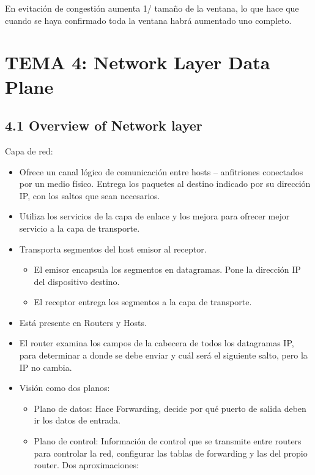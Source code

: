 \documentclass[12pt, twoside, openright]{report} %
\begin{document}
    En evitación de congestión aumenta 1/ tamaño de la ventana, lo que
    hace que cuando se haya confirmado toda la ventana habrá aumentado
    uno completo.

\chapter{TEMA 4: Network Layer Data Plane}

\section{4.1 Overview of Network layer}

    Capa de red:

    \begin{itemize}
    \item
      Ofrece un canal lógico de comunicación entre hosts -- anfitriones
      conectados por un medio físico. Entrega los paquetes al destino
      indicado por su dirección IP, con los saltos que sean necesarios.
    \item
      Utiliza los servicios de la capa de enlace y los mejora para
      ofrecer mejor servicio a la capa de transporte.
    \item
      Transporta segmentos del host emisor al receptor.

      \begin{itemize}
      \item
        El emisor encapsula los segmentos en datagramas. Pone la
        dirección IP del dispositivo destino.
      \item
        El receptor entrega los segmentos a la capa de transporte.
      \end{itemize}
    \item
      Está presente en Routers y Hosts.
    \item
      El router examina los campos de la cabecera de todos los
      datagramas IP, para determinar a donde se debe enviar y cuál será
      el siguiente salto, pero la IP no cambia.
    \item
      Visión como dos planos:

      \begin{itemize}
      \item
        Plano de datos: Hace Forwarding, decide por qué puerto de salida
        deben ir los datos de entrada.
      \item
        Plano de control: Información de control que se transmite entre
        routers para controlar la red, configurar las tablas de
        forwarding y las del propio router. Dos aproximaciones:


\end{itemize}
\end{itemize}
\end{document}

